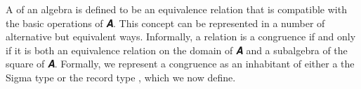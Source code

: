 A  of an algebra  is defined to be an equivalence relation that is compatible with the basic operations of \ab 𝑨. This concept can be represented in a number of alternative but equivalent ways.  Informally, a relation is a congruence if and only if it is both an equivalence relation on the domain of \ab 𝑨 and a subalgebra of the square of \ab 𝑨.  Formally, we represent a congruence as an inhabitant of either a the Sigma type  or the record type , which we now define.
\ccpad
\begin{code}%
\>[0][@{}l@{\AgdaIndent{0}}]%
\>[1]\AgdaSpace{}%
\AgdaSpace{}%
\AgdaSymbol{(}\AgdaSpace{}%
\AgdaSymbol{:}\AgdaSpace{}%
\AgdaSpace{}%
\AgdaSpace{}%
\AgdaSymbol{)(}\AgdaSpace{}%
\AgdaSymbol{:}\AgdaSpace{}%
\AgdaSpace{}%
\AgdaSpace{}%
\AgdaSpace{}%
\AgdaSpace{}%
\AgdaSymbol{)}\AgdaSpace{}%
\AgdaSymbol{:}\AgdaSpace{}%
\AgdaSpace{}%
\AgdaSpace{}%
\AgdaSpace{}%
\AgdaSpace{}%
%
\>[70]\<%
\\
\>[1][@{}l@{\AgdaIndent{0}}]%
\>[2]\AgdaSpace{}%
\<%
\\
%
\>[2]\<%
\\
\>[2][@{}l@{\AgdaIndent{0}}]%
\>[3]\AgdaSpace{}%
\AgdaSymbol{:}\AgdaSpace{}%
\AgdaSpace{}%
\<%
\\
%
\>[3]\AgdaSpace{}%
\AgdaSymbol{:}\AgdaSpace{}%
\AgdaSpace{}%
\AgdaSpace{}%
\<%
\\
%
\\[\AgdaEmptyExtraSkip]%
%
\>[1]\AgdaSpace{}%
\AgdaSymbol{:}\AgdaSpace{}%

\end{code}
